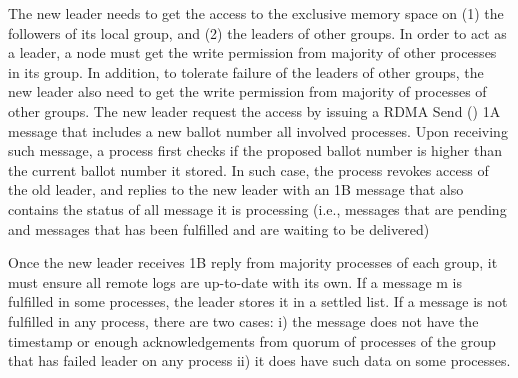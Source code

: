 The new leader needs to get the access to the exclusive memory space on (1) the
followers of its local group, and (2) the leaders of other groups. In order to
act as a leader, a node must get the write permission from majority of other
processes in its group. In addition, to tolerate failure of the leaders of other
groups, the new leader also need to get the write permission from majority of
processes of other groups. The new leader request the access by issuing a RDMA
Send () 1A message that includes a new ballot
number all involved processes. Upon receiving such message, a process first
checks if the proposed ballot number is higher than the current ballot number it
stored. In such case, the process revokes access of the old leader, and replies
to the new leader with an 1B message that also contains the status of all
message it is processing (i.e., messages that are pending and messages that has
been fulfilled and are waiting to be delivered)

Once the new leader receives 1B reply from majority processes of each group, it
must ensure all remote logs are up-to-date with its own. If a message m is
fulfilled in some processes, the leader stores it in a settled list. If a
message is not fulfilled in any process, there are two cases: i)  the message
does not have the timestamp or enough acknowledgements from quorum of processes
of the group that has failed leader on any process ii) it does have such data on
some processes.









